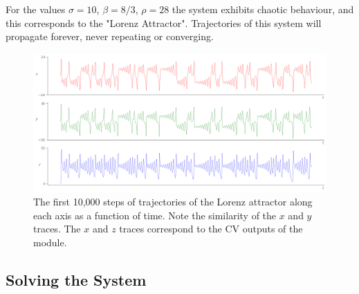 \documentclass{tufte-handout}
\begin{document}
For the values $\sigma=10$, $\beta=8/3$, $\rho=28$ the system exhibits chaotic behaviour, and this corresponds to the "Lorenz Attractor". Trajectories of this system will propagate forever, never repeating or converging.



\begin{figure}[h]
  \includegraphics[width=\linewidth]{control_voltages.png}%
  \caption{The first 10,000 steps of trajectories of the Lorenz attractor along each axis as a function of time. Note the similarity of the $x$ and $y$ traces. The $x$ and $z$ traces correspond to the CV outputs of the module.}%
  \label{fig:control_voltages}%
\end{figure}









\subsection{Solving the System}\label{sec:solving_the_system}
\end{document}
